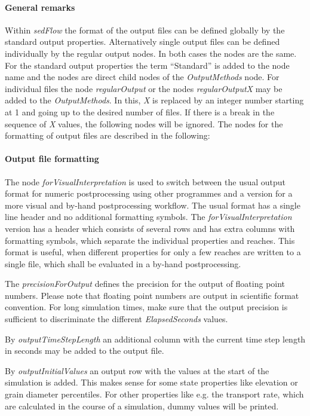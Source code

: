\documentclass[11pt,a4paper]{article}
\begin{document}
\paragraph{General remarks}
Within \emph{sedFlow} the format of the output files can be defined globally by the standard output properties. Alternatively single output files can be defined individually by the regular output nodes. In both cases the nodes are the same. For the standard output properties the term ``Standard'' is added to the node name and the nodes are direct child nodes of the \emph{OutputMethods} node. For individual files the node \emph{regularOutput} or the nodes \emph{regularOutputX} may be added to the \emph{OutputMethods}. In this, \emph{X} is replaced by an integer number starting at 1 and going up to the desired number of files. If there is a break in the sequence of \emph{X} values, the following nodes will be ignored. The nodes for the formatting of output files are described in the following:

\paragraph{Output file formatting}
The node \emph{forVisualInterpretation} is used to switch between the usual output format for numeric postprocessing using other programmes and a version for a more visual and by-hand postprocessing workflow. The usual format has a single line header and no additional formatting symbols. The \emph{forVisualInterpretation} version has a header which consists of several rows and has extra columns with formatting symbols, which separate the individual properties and reaches. This format is useful, when different properties for only a few reaches are written to a single file, which shall be evaluated in a by-hand postprocessing.

The \emph{precisionForOutput} defines the precision for the output of floating point numbers. Please note that floating point numbers are output in scientific format convention. For long simulation times, make sure that the output precision is sufficient to discriminate the different \emph{ElapsedSeconds} values.

By \emph{outputTimeStepLength} an additional column with the current time step length in seconds may be added to the output file.

By \emph{outputInitialValues} an output row with the values at the start of the simulation is added. This makes sense for some state properties like elevation or grain diameter percentiles. For other properties like e.g. the transport rate, which are calculated in the course of a simulation, dummy values will be printed.
\end{document}
